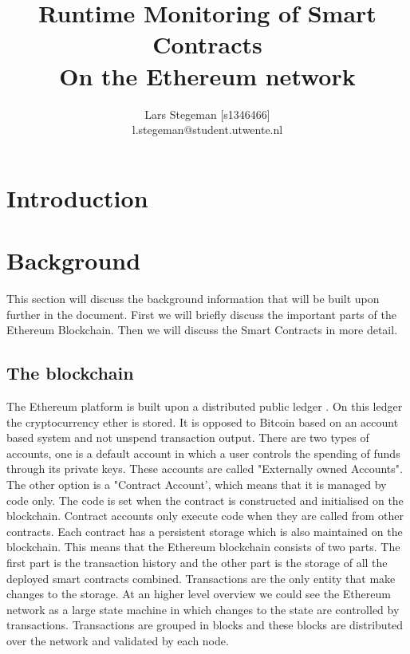 \documentclass[a4paper]{article}
\title{Runtime Monitoring of Smart Contracts \\
\large On the Ethereum network \\}
\author{Lars Stegeman [s1346466]\\ l.stegeman@student.utwente.nl}
\begin{document}
\maketitle

\tableofcontents


\section{Introduction}

\section{Background}
This section will discuss the background information that will be built upon further in the document. First we will briefly discuss the important parts of the Ethereum Blockchain. Then we will discuss the Smart Contracts in more detail.
\subsection{The blockchain}
The Ethereum platform is built upon a distributed public ledger . On this ledger the cryptocurrency ether is stored. It is opposed to Bitcoin based on an account based system and not unspend transaction output. There are two types of accounts, one is a default account in which a user controls the spending of funds through its private keys. These accounts are called "Externally owned Accounts". The other option is a "Contract Account', which means that it is managed by code only. The code is set when the contract is constructed and initialised on the blockchain. Contract accounts only execute code when they are called from other contracts. Each contract has a persistent storage which is also maintained on the blockchain. This means that the Ethereum blockchain consists of two parts. The first part is the transaction history and the other part is the storage of all the deployed smart contracts combined. Transactions are the only entity that make changes to the storage. At an higher level overview we could see the Ethereum network as a large state machine in which changes to the state are controlled by transactions. Transactions are grouped in blocks and these blocks are distributed over the network and validated by each node. 
\end{document}
